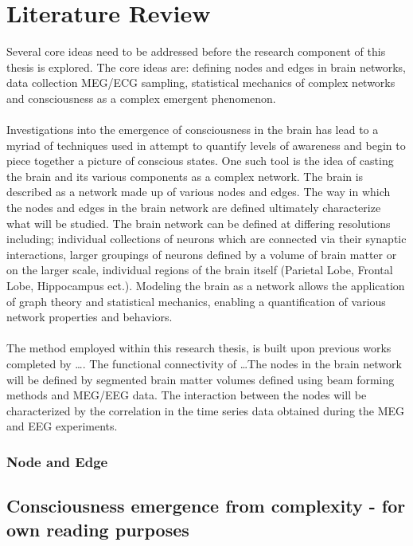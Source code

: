 \documentclass{article}
\begin{document}
\section{Literature Review}
Several core ideas need to be addressed before the research component of this thesis is explored. The core ideas are: defining nodes and edges in brain networks, data collection MEG/ECG sampling, statistical mechanics of complex networks and consciousness as a complex emergent phenomenon.\\
\\
Investigations into the emergence of consciousness in the brain has lead to a myriad of techniques used in attempt to quantify levels of awareness and begin to piece together a picture of conscious states. One such tool is the idea of casting the brain and its various components as a complex network. The brain is described as a network made up of various nodes and edges. The way in which the nodes and edges in the brain network are defined ultimately characterize what will be studied. The brain network can be defined at differing resolutions including; individual collections of neurons which are connected via their synaptic interactions, larger groupings of neurons defined by a volume of brain matter or on the larger scale, individual regions of the brain itself (Parietal Lobe, Frontal Lobe, Hippocampus ect.). Modeling the brain as a network allows the application of graph theory and statistical mechanics, enabling a quantification of various network properties and behaviors.\\
\\
The method employed within this research thesis, is built upon previous works completed by \dots. The functional connectivity of \dots The nodes in the brain network will be defined by segmented brain matter volumes defined using beam forming methods and MEG/EEG data. The interaction between the nodes will be characterized by the correlation in the time series data obtained during the MEG and EEG experiments.

\subsubsection*{Node and Edge}


\subsection{Consciousness emergence from complexity - for own reading purposes}
\end{document}
